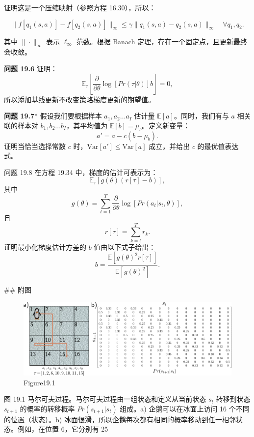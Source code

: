 证明这是一个压缩映射（参照方程 16.30），所以：

\[
\| f[q_1(s, a)] - f[q_2(s, a)] \|_{\infty} \leq \gamma \| q_1(s, a) - q_2(s, a) \|_{\infty} \quad \forall q_1, q_2. \tag{19.47}
\]

其中 \(\| \cdot \|_{\infty}\) 表示 \(\ell_{\infty}\) 范数。根据 Banach 定理，存在一个固定点，且更新最终会收敛。

\textbf{问题 19.6} 证明：
\[
\mathbb{E}_\tau \left[ \frac{\partial}{\partial \theta} \log[Pr(\tau|\theta)]b \right] = 0, \tag{19.48}
\]
所以添加基线更新不改变策略梯度更新的期望值。

\textbf{问题 19.7}* 假设我们要根据样本 \(a_1, a_2 \ldots a_I\) 估计量 \(\mathbb{E}[a]\)。同时，我们有与 \(a\) 相关联的样本对 \(b_1, b_2 \ldots b_I\)，其平均值为 \(\mathbb{E}[b] = \mu_b\)。定义新变量：
\[
a' = a - c(b - \mu_b). \tag{19.49}
\]
证明当恰当选择常数 \(c\) 时，\(\text{Var}[a'] \leq \text{Var}[a]\) 成立，并给出 \(c\) 的最优值表达式。

问题 19.8 在方程 19.34 中，梯度的估计可表示为：
\[
\mathbb{E}_\tau \left[ g(\theta)(r[\tau] - b) \right], \tag{19.50}
\]
其中
\[
g(\theta) = \sum_{t=1}^{T} \frac{\partial}{\partial \theta} \log[Pr(a_t|s_t, \theta)], \tag{19.51}
\]
且
\[
r[\tau] = \sum_{k=t}^{T} r_k. \tag{19.52}
\]
证明最小化梯度估计方差的 \(b\) 值由以下式子给出：
\[
b = \frac{\mathbb{E}[g(\theta)^2r[\tau]]}{\mathbb{E}[g(\theta)^2]}. \tag{19.53}
\]


## 附图
\begin{figure}[h!]
\centering
\includegraphics[width=0.7\linewidth]{png/chapter19/ReinforceMDP.png}
\caption{Figure19.1}
\end{figure}
图 19.1 马尔可夫过程。马尔可夫过程由一组状态和定义从当前状态 \(s_t\) 转移到状态 \(s_{t+1}\) 的概率的转移概率 \(Pr(s_{t+1}|s_t)\) 组成。a) 企鹅可以在冰面上访问 16 个不同的位置（状态）。b) 冰面很滑，所以企鹅每次都有相同的概率移动到任一相邻状态。例如，在位置 6，它分别有 25%

